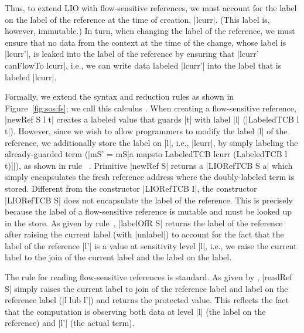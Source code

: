 Thus, to extend LIO with flow-sensitive references, we must account for the label
on the label of the reference at the time of creation, |lcurr|.
%
(This label is, however, immutable.)
%
In turn, when changing the label of the reference, we must ensure that no data
from the context at the time of the change, whose label is |lcurr'|, is leaked
into the label of the reference by ensuring that |lcurr' canFlowTo lcurr|,
i.e., we can write data labeled |lcurr'| into the label that is labeled |lcurr|.
 
Formally, we extend the \lio{} syntax and reduction rules as shown in
Figure~\ref{fig:sos:fs}; we call this calculus \liofs{}.
%
When creating a flow-sensitive reference, |newRef S l t| creates a labeled
value that guards |t| with label |l| (|LabeledTCB l t|).
%
However, since we wish to allow programmers to modify the label |l| of the
reference, we additionally store the label on |l|, i.e., |lcurr|, by simply
labeling the already-guarded term (|mS' = mS[a mapsto LabeledTCB lcurr
(LabeledTCB l t)]|), as shown in rule~ .
%
Primitive |newRef S| returns a |LIORefTCB S a| which simply encapsulates the fresh
reference address where the doubly-labeled term is stored.
%
Different from the constructor |LIORefTCB I|,  the constructor |LIORefTCB S|
does not encapsulate the label of the reference. 
%
This is precisely because the label of a flow-sensitive reference is 
mutable and must be looked up in the store.
%
As given by rule~, |labelOfR S| returns the label of the
reference after raising the current label (with |unlabel|) to account for the
fact that the label of the reference |l'| is a value at sensitivity level |l|,
i.e., we raise the current label to the join of the current label and the label
on the label.

The rule for reading flow-sensitive references is standard.
%
As given by , |readRef S| simply raises the
current label to join of the reference label and label on the
reference label (|l lub l'|) and returns the protected value.
%
This reflects the fact that the computation is observing both data at
level |l| (the label on the reference) and |l'| (the actual term).


